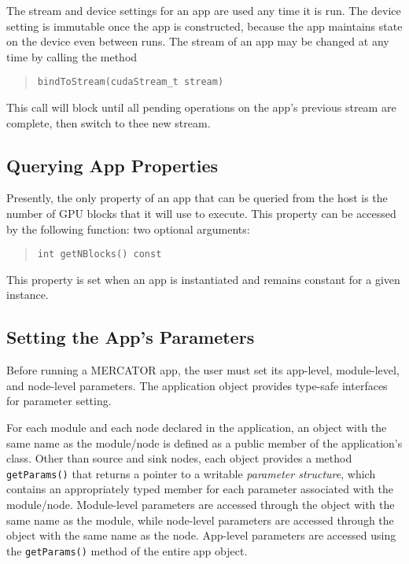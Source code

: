 \documentclass[11pt]{article}
\begin{document}
The stream and device settings for an app are used any time it is run.
The device setting is immutable once the app is constructed, because
the app maintains state on the device even between runs.  The stream
of an app may be changed at any time by calling the method
\begin{quote}
\texttt{bindToStream(cudaStream_t stream)}
\end{quote}
This call will block until all pending operations on the app's
previous stream are complete, then switch to thee new stream.

\subsection{Querying App Properties}

Presently, the only property of an app that can be queried from the
host is the number of GPU blocks that it will use to execute.  This
property can be accessed by the following function: two optional
arguments:
\begin{quote}
\texttt{int getNBlocks() const}
\end{quote}
This property is set when an app is instantiated and remains
constant for a given instance.


\subsection{Setting the App's Parameters}

Before running a MERCATOR app, the user must set its app-level,
module-level, and node-level parameters.  The application object
provides type-safe interfaces for parameter setting.

For each module and each node declared in the application, an object
with the same name as the module/node is defined as a public member of
the application's class.  Other than source and sink nodes, each
object provides a method \texttt{getParams()} that returns a pointer
to a writable \emph{parameter structure}, which contains an
appropriately typed member for each parameter associated with the
module/node.  Module-level parameters are accessed through the object
with the same name as the module, while node-level parameters are
accessed through the object with the same name as the node.  App-level
parameters are accessed using the \texttt{getParams()} method of the
entire app object.
\end{document}
